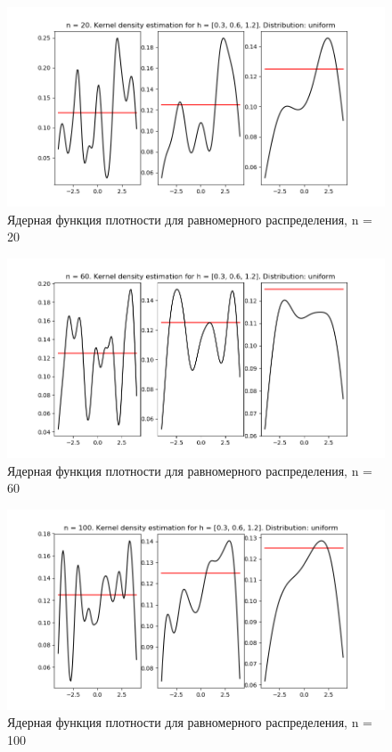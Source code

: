 \documentclass[a4]{article}
\begin{document}
\begin{center}
    \begin{figure}[H]
 \caption{Ядерная функция плотности для равномерного распределения, n = 20}
\includegraphics[width=\textwidth]{d_uniform20.png}
\end{figure}
    \begin{figure}[H]
 \caption{Ядерная функция плотности для равномерного распределения, n = 60}
\includegraphics[width=\textwidth]{d_uniform60.png}
\end{figure}
    \begin{figure}[H]
 \caption{Ядерная функция плотности для равномерного распределения, n = 100}
\includegraphics[width=\textwidth]{d_uniform100.png}
\end{figure}
\end{center}
\end{document}

